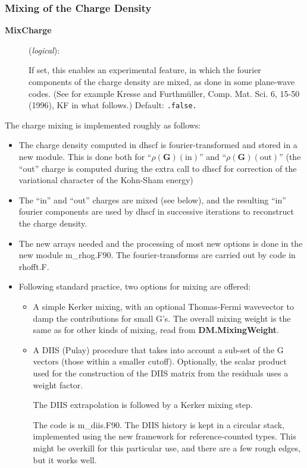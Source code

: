 \fi

\subsubsection{Mixing of the Charge Density}

\begin{description}

\item[\textbf{MixCharge}] (\textit{logical}):

If set, this enables an experimental feature, in which the fourier
components of the charge density are mixed, as done in some plane-wave
codes. (See for example Kresse and Furthm\"uller, Comp. Mat. Sci. 6,
15-50 (1996), KF in what follows.) Default: \texttt{.false.}

\end{description}

The charge mixing is implemented roughly as follows:

\begin{itemize}
  \item The charge density computed in dhscf is fourier-transformed
  and stored in a new module. This is done both for
  ``$\rho(\mathbf{G})(\mathrm{in})$'' and
  ``$\rho(\mathbf{G})(\mathrm{out})$'' (the ``out'' charge is computed
  during the extra call to dhscf for correction of the variational
  character of the Kohn-Sham energy) \item The ``in'' and ``out''
  charges are mixed (see below), and the resulting ``in'' fourier
  components are used by dhscf in successive iterations to reconstruct
  the charge density.  \item The new arrays needed and the processing
  of most new options is done in the new module m\_rhog.F90. The
  fourier-transforms are carried out by code in rhofft.F.  \item
  Following standard practice, two options for mixing are offered:
  \begin{itemize}
  \item A simple Kerker mixing, with an optional Thomas-Fermi wavevector to 
  damp the contributions for small G's. The overall mixing weight is
  the same as for other kinds of mixing, read from \textbf{DM.MixingWeight}.
  \item A DIIS (Pulay) procedure that takes into account a sub-set of
    the G vectors (those within a smaller cutoff). Optionally, the
    scalar product used for the construction of the DIIS matrix from
    the residuals uses a weight factor. 

    The DIIS extrapolation is followed by a  Kerker mixing step.

    The code is m\_diis.F90. The DIIS history is kept in a circular
    stack, implemented using the new framework for reference-counted
    types. This might be overkill for this particular use, and there
    are a few rough edges, but it works well.
  \end{itemize}
\end{itemize}

